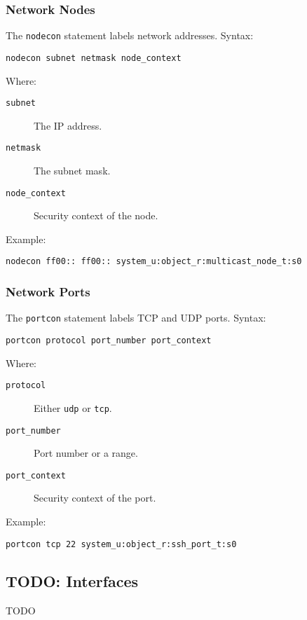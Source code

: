 \subsubsection{Network Nodes}
The \texttt{nodecon} statement labels network addresses. Syntax:
\begin{lstlisting}[language=te]
nodecon subnet netmask node_context
\end{lstlisting}
Where:
\begin{description}
    \item [\texttt{subnet}] The IP address.
    \item [\texttt{netmask}] The subnet mask.
    \item [\texttt{node\_context}] Security context of the node.
\end{description}
Example:
\begin{lstlisting}[language=te]
nodecon ff00:: ff00:: system_u:object_r:multicast_node_t:s0
\end{lstlisting}

\subsubsection{Network Ports}
The \texttt{portcon} statement labels TCP and UDP ports. Syntax:
\begin{lstlisting}[language=te]
portcon protocol port_number port_context
\end{lstlisting}
Where:
\begin{description}
    \item [\texttt{protocol}] Either \texttt{udp} or \texttt{tcp}.
    \item [\texttt{port\_number}] Port number or a range.
    \item [\texttt{port\_context}] Security context of the port.
\end{description}
Example:
\begin{lstlisting}[language=te]
portcon tcp 22 system_u:object_r:ssh_port_t:s0
\end{lstlisting}

\subsection{TODO: Interfaces}
\label{interfaces}
TODO

